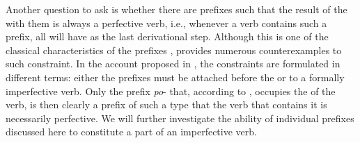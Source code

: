 Another question to ask is whether there are prefixes such that the result of the  with them is always a perfective verb, i.e., whenever a verb contains such a prefix, all  will have  as the last derivational step. Although this is one of the classical characteristics of the  prefixes \citep[see, e.g.][]{Ramchand:04, Svenonius:04a, Romanova:06}, \citet{Tatevosov:07, Tatevosov:09} provides numerous counterexamples to such constraint. In the account proposed in \citealt{Tatevosov:09}, the constraints are formulated in different terms: either the prefixes must be attached before the  or to a formally imperfective verb. Only the  prefix \textit{po}- that, according to \citet{Tatevosov:09}, occupies the  of the verb, is then clearly a prefix of such a type that the verb that contains it is necessarily perfective. We will further investigate the ability of individual prefixes discussed here to constitute a part of an imperfective verb.
